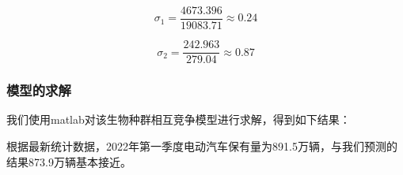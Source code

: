 \documentclass[]{article}
\begin{document}
\begin{equation}
  \sigma_1=\frac{4673.396}{19083.71}\approx0.24
\end{equation}

\begin{equation}
  \sigma_2= \frac{242.963}{279.04} \approx0.87
\end{equation}

\subsubsection{模型的求解}

我们使用matlab对该生物种群相互竞争模型进行求解，得到如下结果：


根据最新统计数据，2022年第一季度电动汽车保有量为891.5万辆，与我们预测的结果873.9万辆基本接近。
\end{document}
